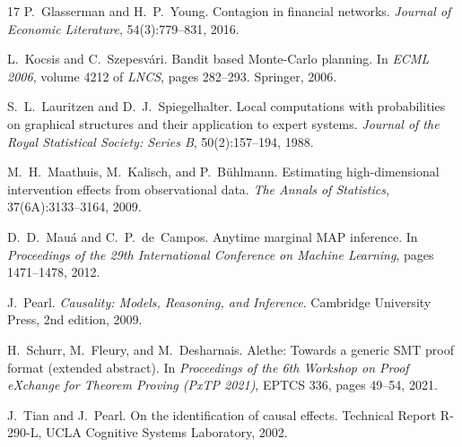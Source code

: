 \documentclass[11pt,a4paper]{article}
\begin{document}
\begin{thebibliography}{17}
P.~Glasserman and H.~P.~Young.
\newblock Contagion in financial networks.
\newblock \emph{Journal of Economic Literature}, 54(3):779--831, 2016.

L.~Kocsis and C.~Szepesv\'{a}ri.
\newblock Bandit based {Monte-Carlo} planning.
\newblock In \emph{ECML 2006}, volume 4212 of \emph{LNCS}, pages 282--293. Springer, 2006.

S.~L.~Lauritzen and D.~J.~Spiegelhalter.
\newblock Local computations with probabilities on graphical structures and their application to expert systems.
\newblock \emph{Journal of the Royal Statistical Society: Series B}, 50(2):157--194, 1988.

M.~H.~Maathuis, M.~Kalisch, and P.~B\"{u}hlmann.
\newblock Estimating high-dimensional intervention effects from observational data.
\newblock \emph{The Annals of Statistics}, 37(6A):3133--3164, 2009.

D.~D.~Mau\'{a} and C.~P.~de~Campos.
\newblock Anytime marginal {MAP} inference.
\newblock In \emph{Proceedings of the 29th International Conference on Machine Learning}, pages 1471--1478, 2012.

J.~Pearl.
\newblock \emph{Causality: Models, Reasoning, and Inference}.
\newblock Cambridge University Press, 2nd edition, 2009.

H.~Schurr, M.~Fleury, and M.~Desharnais.
\newblock Alethe: Towards a generic {SMT} proof format (extended abstract).
\newblock In \emph{Proceedings of the 6th Workshop on Proof eXchange for Theorem Proving (PxTP 2021)}, EPTCS 336, pages 49--54, 2021.

J.~Tian and J.~Pearl.
\newblock On the identification of causal effects.
\newblock Technical Report R-290-L, UCLA Cognitive Systems Laboratory, 2002.

\end{thebibliography}
\end{document}
